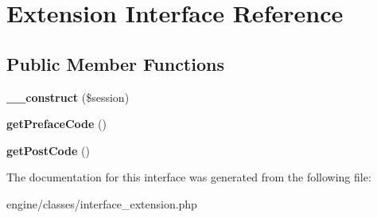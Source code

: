 \hypertarget{interfaceExtension}{\section{Extension Interface Reference}
\label{interfaceExtension}
}
\subsection*{Public Member Functions}
\begin{DoxyCompactItemize}
\item 
\hypertarget{interfaceExtension_aad71d40510cdd0419880b8d0ca69b60b}{{\bfseries \-\_\-\-\_\-construct} (\$session)}\label{interfaceExtension_aad71d40510cdd0419880b8d0ca69b60b}

\item 
\hypertarget{interfaceExtension_a33fb91d202931e147dcd7ca687335c85}{{\bfseries get\-Preface\-Code} ()}\label{interfaceExtension_a33fb91d202931e147dcd7ca687335c85}

\item 
\hypertarget{interfaceExtension_aeef8c20babee8dc0177b3bf4e13cf2df}{{\bfseries get\-Post\-Code} ()}\label{interfaceExtension_aeef8c20babee8dc0177b3bf4e13cf2df}

\end{DoxyCompactItemize}


The documentation for this interface was generated from the following file\-:\begin{DoxyCompactItemize}
\item 
engine/classes/interface\-\_\-extension.\-php\end{DoxyCompactItemize}
